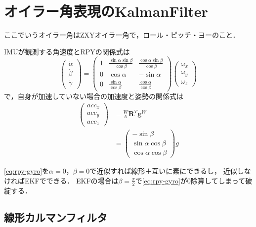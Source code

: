 \section{オイラー角表現のKalmanFilter} \label{sec:rpy_kalman_filter}
ここでいうオイラー角はZXYオイラー角で，ロール・ピッチ・ヨーのこと．

IMUが観測する角速度とRPYの関係式は
\begin{equation}
  \begin{pmatrix}
    \dot{\alpha}\\
    \dot{\beta}\\
    \dot{\gamma}
  \end{pmatrix} =
  \begin{pmatrix}
    1 & \frac{\sin \alpha \sin \beta}{\cos \beta} & \frac{\cos \alpha \sin \beta}{\cos \beta} \\
    0 & \cos \alpha & - \sin \alpha \\
    0 & \frac{\sin \alpha}{\cos \beta} & \frac{\cos \alpha}{\cos \beta}
  \end{pmatrix}
  \begin{pmatrix}
    \omega_x\\
    \omega_y\\
    \omega_z
  \end{pmatrix}\label{eq:rpy-gyro}
\end{equation}
で，自身が加速していない場合の加速度と姿勢の関係式は
\begin{align}
  \begin{pmatrix}
    acc_x\\
    acc_y\\
    acc_z
  \end{pmatrix} &= {}^{W}_{A}\boldsymbol{R}^{T} \boldsymbol{g}^{W}\\
  &= \begin{pmatrix}
    -\sin \beta\\
    \sin \alpha \cos \beta\\
    \cos \alpha \cos \beta
  \end{pmatrix}
  g
\end{align}

\autoref{eq:rpy-gyro}を$\alpha = 0$，$\beta = 0$で近似すれば線形＋互いに素にできるし，
近似しなければEKFでできる．
EKFの場合は$\beta = \frac{\pi}{2}$で\autoref{eq:rpy-gyro}が0除算してしまって破綻する．

\subsection{線形カルマンフィルタ}
